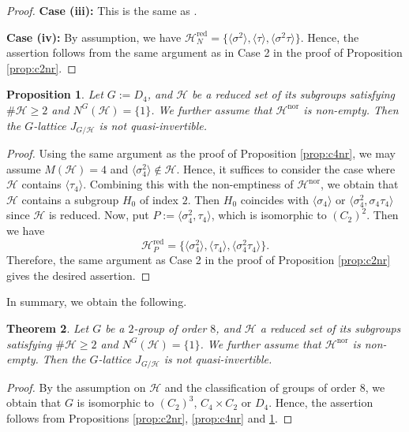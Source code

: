 \documentclass[12pt]{amsart}
\theoremstyle{plain}
\newtheorem{thm}{Theorem}[section]
\newtheorem{prop}[thm]{Proposition}
\theoremstyle{definition}
\numberwithin{thm}{section}
\numberwithin{equation}{section}
\newcommand{\cH}{\mathcal{H}}
\DeclareMathOperator{\red}{red}
\DeclareMathOperator{\nor}{nor}
\begin{document}
\begin{proof}
\textbf{Case (iii): }This is the same as \cite[Lemma 2.2]{Endo2011}. 

\textbf{Case (iv): }By assumption, we have %
$\cH_{N}^{\red}=\{\langle \sigma^{2}\rangle,\langle \tau\rangle,\langle \sigma^{2}\tau\rangle\}$. Hence, the assertion follows from the same argument as in Case 2 in the proof of Proposition \ref{prop:c2nr}. 
\end{proof}

\begin{prop}\label{prop:d4nr}
Let $G:=D_{4}$, and $\cH$ be a reduced set of its subgroups satisfying $\#\cH\geq 2$ and $N^{G}(\cH)=\{1\}$. We further assume that $\cH^{\nor}$ is non-empty. Then the $G$-lattice $J_{G/\cH}$ is not quasi-invertible. 
\end{prop}

\begin{proof}
Using the same argument as the proof of Proposition \ref{prop:c4nr}, we may assume $M(\cH)=4$ and $\langle \sigma_{4}^{2}\rangle \notin \cH$. Hence, it suffices to consider the case where $\cH$ contains $\langle \tau_{4} \rangle$. Combining this with the non-emptiness of $\cH^{\nor}$, we obtain that $\cH$ contains a subgroup $H_{0}$ of index $2$. Then $H_{0}$ coincides with $\langle \sigma_{4} \rangle$ or $\langle \sigma_{4}^{2},\sigma_{4}\tau_{4} \rangle$ since $\cH$ is reduced. Now, put $P:=\langle \sigma_{4}^{2},\tau_{4} \rangle$, which is isomorphic to $(C_{2})^{2}$. Then we have 
\begin{equation*}
    \cH_{P}^{\red}=\{\langle \sigma_{4}^{2}\rangle,\langle \tau_{4} \rangle,\langle \sigma_{4}^{2}\tau_{4} \rangle\}. 
\end{equation*}
Therefore, the same argument as Case 2 in the proof of Proposition \ref{prop:c2nr} gives the desired assertion. 
\end{proof}

In summary, we obtain the following. 

\begin{thm}\label{thm:ind1}
Let $G$ be a $2$-group of order $8$, and $\cH$ a reduced set of its subgroups satisfying $\#\cH \geq 2$ and $N^{G}(\cH)=\{1\}$. We further assume that $\cH^{\nor}$ is non-empty. Then the $G$-lattice $J_{G/\cH}$ is not quasi-invertible. 
\end{thm}

\begin{proof}
By the assumption on $\cH$ and the classification of groups of order $8$, we obtain that $G$ is isomorphic to $(C_{2})^{3}$, $C_{4}\times C_{2}$ or $D_{4}$. Hence, the assertion follows from Propositions \ref{prop:c2nr}, \ref{prop:c4nr} and \ref{prop:d4nr}. 
\end{proof}
\end{document}
